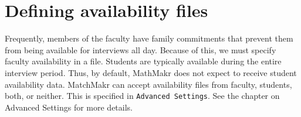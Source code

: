 %
%
\section{Defining availability files}

Frequently, members of the faculty have family commitments that prevent them from being available for interviews all day.  Because of this, we must specify faculty availability in a file.  Students are typically available during the entire interview period.  Thus, by default, MathMakr does not expect to receive student availability data.  MatchMakr can accept availability files from faculty, students, both, or neither.  This is specified in \texttt{Advanced Settings}.  See the chapter on Advanced Settings for more details.


